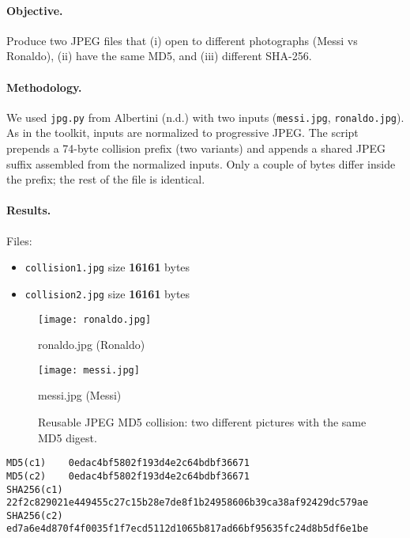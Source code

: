 \documentclass[runningheads]{llncs}
\begin{document}
    \paragraph{Objective.}
    Produce two JPEG files that (i) open to different photographs (Messi vs Ronaldo), (ii) have the same MD5, and (iii) different SHA-256.

    \paragraph{Methodology.}
    We used \texttt{jpg.py} from Albertini (n.d.) with two inputs (\texttt{messi.jpg}, \texttt{ronaldo.jpg}). As in the toolkit, inputs are normalized to progressive JPEG. The script prepends a 74-byte collision prefix (two variants) and appends a shared JPEG suffix assembled from the normalized inputs. Only a couple of bytes differ inside the prefix; the rest of the file is identical.

    \paragraph{Results.}
    Files:
    \begin{itemize}
        \item \texttt{collision1.jpg} size \textbf{16161} bytes
        \item \texttt{collision2.jpg} size \textbf{16161} bytes
    \end{itemize}

    \begin{figure}[h!]
        \centering
        \begin{minipage}{0.48\textwidth}
            \centering
            \texttt{[image: ronaldo.jpg]}
            \caption*{ronaldo.jpg (Ronaldo)}
        \end{minipage}\hfill
        \begin{minipage}{0.48\textwidth}
            \centering
            \texttt{[image: messi.jpg]}
            \caption*{messi.jpg (Messi)}
        \end{minipage}
        \caption{Reusable JPEG MD5 collision: two different pictures with the same MD5 digest.}
        \label{fig:reusable-jpeg}
    \end{figure}

    \begin{lstlisting}[style=hashblock,caption={Hashes for the reusable JPEG pair}]
MD5(c1)    0edac4bf5802f193d4e2c64bdbf36671
MD5(c2)    0edac4bf5802f193d4e2c64bdbf36671
SHA256(c1) 22f2c829021e449455c27c15b28e7de8f1b24958606b39ca38af92429dc579ae
SHA256(c2) ed7a6e4d870f4f0035f1f7ecd5112d1065b817ad66bf95635fc24d8b5df6e1be
    \end{lstlisting}
\end{document}
